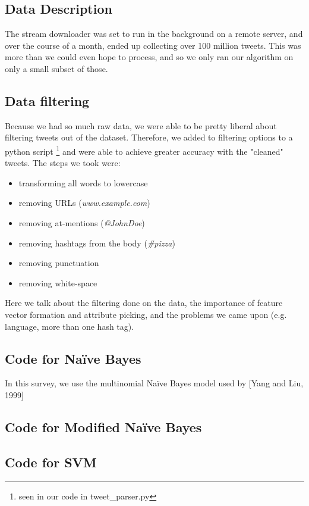 \documentclass[11pt,letterpaper]{article}
\begin{document}
\subsection{Data Description}
The stream downloader was set to run in the background on a remote server, and over the course of a month, ended up collecting over 100 million tweets. This was more than we could even hope to process, and so we only ran our algorithm on only a small subset of those.

\subsection{Data filtering}
Because we had so much raw data, we were able to be pretty liberal about filtering tweets out of the dataset. Therefore, we added to filtering options to a python script \footnote{seen in our code in tweet\_parser.py} and were able to achieve greater accuracy with the "cleaned" tweets. The steps we took were:
\begin{itemize}
\item transforming all words to lowercase
\item removing URLs (\textit{www.example.com})
\item removing at-mentions (\textit{@JohnDoe})
\item removing hashtags from the body (\textit{\#pizza})
\item removing punctuation
\item removing white-space
\end{itemize}

Here we talk about the filtering done on the data, the importance of feature vector formation and attribute picking, and the problems we came upon (e.g. language, more than one hash tag).

\subsection{Code for Na{\"i}ve Bayes}
  In this survey, we use the multinomial Na{\"i}ve Bayes model used by [Yang and Liu, 1999]

\subsection{Code for Modified Na{\"i}ve Bayes}

\subsection{Code for SVM}
\end{document}
